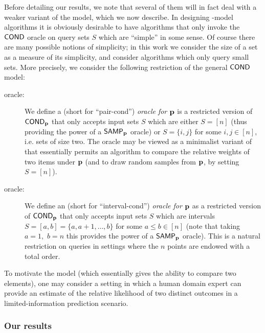 Before detailing our results, we note that several of them will in fact deal with a weaker variant of the \COND model,
which we now describe.  In designing \COND-model algorithms
it is obviously desirable to have algorithms that only invoke
the ${\sf COND}$ oracle on query sets $S$ which are ``simple'' in some sense.
Of course there are many possible notions of simplicity;
in this work we consider the size of a set
as a measure of its simplicity, and consider algorithms which only query small sets.  More precisely, we consider the following
restriction of the general ${\sf COND}$ model:
\begin{description}
\item[\PCOND oracle:]
We define a \emph{\PCOND} {(short for ``pair-cond'')
\emph{oracle for $\mathbf{p}$} is} a restricted version
of ${\sf COND}_{\mathbf{p}}$ that only accepts input sets $S$ which are either
$S=[n]$ (thus providing the power of a ${\sf SAMP}_{\mathbf{p}}$ oracle)
or $S=\{i,j\}$ for some $i,j \in [n]$, i.e. sets of size two.  The
\PCOND oracle may be viewed as a minimalist variant of \COND
that essentially permits an algorithm to compare the relative weights of
two items under $\mathbf{p}$ (and to draw random samples from $\mathbf{p}$,
by setting $S=[n]$).
\item[\ICOND oracle:]
We define an \emph{\ICOND} {(short for ``interval-cond'')}
\emph{oracle for $\mathbf{p}$} as a restricted version
of ${\sf COND}_{\mathbf{p}}$ that only accepts input sets $S$ which are intervals
$S=[a,b]=\{a,a+1,\dots,b\}$ for some $a \leq b \in [n]$ (note that
taking $a=1,$ $b=n$ this provides the power of a ${\sf SAMP}_{\mathbf{p}}$ oracle).
This is a natural restriction on \COND queries in settings where
the $n$ points are endowed with a total order.
\end{description}

To motivate the \PCOND model (which essentially gives the ability
to compare two elements), one may consider a setting in which a human domain
expert can provide an estimate of the relative likelihood of two distinct
outcomes in a limited-information prediction scenario.

\subsubsection{Our results} \label{sec:ourcont}

